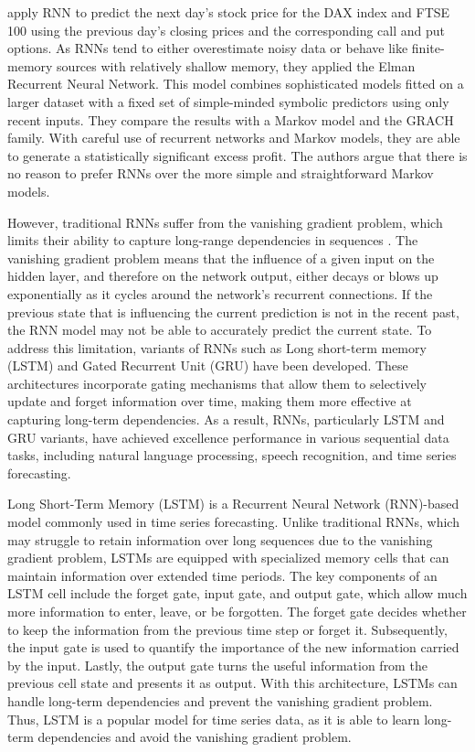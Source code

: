 \documentclass{article}
\begin{document}
\cite{tino2001financial} apply RNN to predict the next day's stock price for the DAX index and FTSE 100 using the previous day's closing prices and the corresponding call and put options. As RNNs tend to either overestimate noisy data or behave like finite-memory sources with relatively shallow memory, they applied the Elman Recurrent Neural Network. This model combines sophisticated models fitted on a larger dataset with a fixed set of simple-minded symbolic predictors using only recent inputs. They compare the results with a Markov model and the GRACH family. With careful use of recurrent networks and Markov models, they are able to generate a statistically significant excess profit. The authors argue that there is no reason to prefer RNNs over the more simple and straightforward Markov models.

However, traditional RNNs suffer from the vanishing gradient problem, which limits their ability to capture long-range dependencies in sequences \citep{hochreiter1997long, graves2012long}. The vanishing gradient problem means that the influence of a given input on the hidden layer, and therefore on the network output, either decays or blows up exponentially as it cycles around the network’s recurrent connections. If the previous state that is influencing the current prediction is not in the recent past, the RNN model may not be able to accurately predict the current state. To address this limitation, variants of RNNs such as Long short-term memory (LSTM) and Gated Recurrent Unit (GRU) have been developed. These architectures incorporate gating mechanisms that allow them to selectively update and forget information over time, making them more effective at capturing long-term dependencies. As a result, RNNs, particularly LSTM and GRU variants, have achieved excellence performance in various sequential data tasks, including natural language processing, speech recognition, and time series forecasting.

Long Short-Term Memory (LSTM) is a Recurrent Neural Network (RNN)-based model commonly used in time series forecasting. Unlike traditional RNNs, which may struggle to retain information over long sequences due to the vanishing gradient problem, LSTMs are equipped with specialized memory cells that can maintain information over extended time periods. The key components of an LSTM cell include the forget gate, input gate, and output gate, which allow much more information to enter, leave, or be forgotten. The forget gate decides whether to keep the information from the previous time step or forget it. Subsequently, the input gate is used to quantify the importance of the new information carried by the input. Lastly, the output gate turns the useful information from the previous cell state and presents it as output. With this architecture, LSTMs can handle long-term dependencies and prevent the vanishing gradient problem. Thus, LSTM is a popular model for time series data, as it is able to learn long-term dependencies and avoid the vanishing gradient problem.
\end{document}
